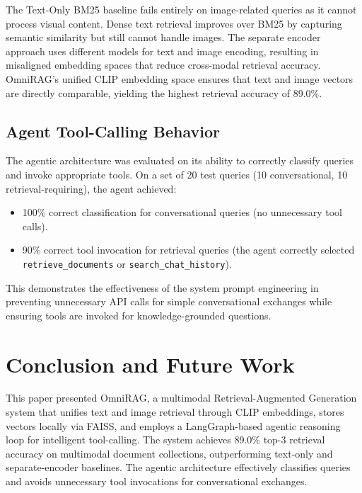 \documentclass[conference]{IEEEtran}
\begin{document}
The Text-Only BM25 baseline fails entirely on image-related queries as it cannot process visual content. Dense text retrieval improves over BM25 by capturing semantic similarity but still cannot handle images. The separate encoder approach uses different models for text and image encoding, resulting in misaligned embedding spaces that reduce cross-modal retrieval accuracy. OmniRAG's unified CLIP embedding space ensures that text and image vectors are directly comparable, yielding the highest retrieval accuracy of 89.0\%.

\subsection{Agent Tool-Calling Behavior}

The agentic architecture was evaluated on its ability to correctly classify queries and invoke appropriate tools. On a set of 20 test queries (10 conversational, 10 retrieval-requiring), the agent achieved:

\begin{itemize}
    \item 100\% correct classification for conversational queries (no unnecessary tool calls).
    \item 90\% correct tool invocation for retrieval queries (the agent correctly selected \texttt{retrieve\_documents} or \texttt{search\_chat\_history}).
\end{itemize}

This demonstrates the effectiveness of the system prompt engineering in preventing unnecessary API calls for simple conversational exchanges while ensuring tools are invoked for knowledge-grounded questions.

\section{Conclusion and Future Work}

This paper presented OmniRAG, a multimodal Retrieval-Augmented Generation system that unifies text and image retrieval through CLIP embeddings, stores vectors locally via FAISS, and employs a LangGraph-based agentic reasoning loop for intelligent tool-calling. The system achieves 89.0\% top-3 retrieval accuracy on multimodal document collections, outperforming text-only and separate-encoder baselines. The agentic architecture effectively classifies queries and avoids unnecessary tool invocations for conversational exchanges.
\end{document}
